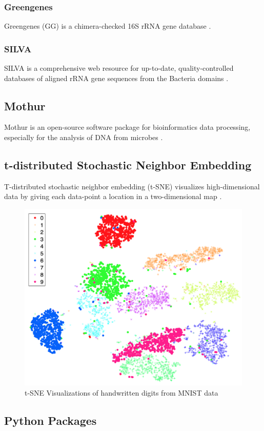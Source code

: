 \documentclass[a4paper]{article}
\begin{document}
            \subsubsection{Greengenes}
                Greengenes (GG) is a chimera-checked 16S rRNA gene database \cite{greengenes1}.

            \subsubsection{SILVA}
                SILVA is a comprehensive web resource for up-to-date, quality-controlled databases of aligned rRNA gene sequences from the Bacteria domains \cite{silva1, silva2}.

        \subsection{Mothur}
            Mothur is an open-source software package for bioinformatics data processing, especially for the analysis of DNA from microbes \cite{mothur1}.

        \subsection[t-SNE]{t-distributed Stochastic Neighbor Embedding}
            T-distributed stochastic neighbor embedding (t-SNE) visualizes high-dimensional data by giving each data-point a location in a two-dimensional map \cite{tsne1}.

            \begin{figure}[p]
                \centering
                \includegraphics[width=0.5 \linewidth]{figures/tsne.png}
                \caption{t-SNE Visualizations of handwritten digits from MNIST data \protect \cite{tsne1}}
                \label{fig:tsne}
            \end{figure}

        \subsection{Python Packages}
\end{document}
